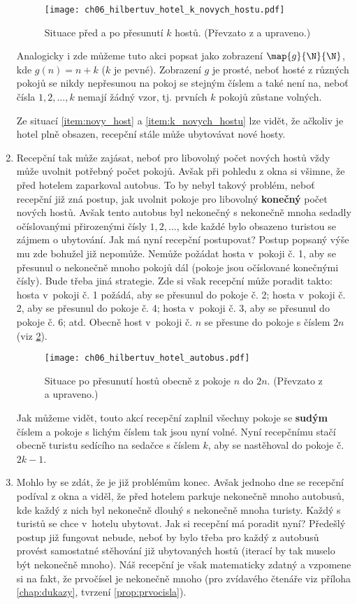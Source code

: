 \begin{enumerate}[label=\textit{(\roman*)}]
    \begin{figure}[h]
        \centering
        \texttt{[image: ch06\_hilbertuv\_hotel\_k\_novych\_hostu.pdf]}
        \caption{Situace před a po přesunutí $k$ hostů. (Převzato z \cite{Rmoutil2022} a upraveno.)}
        \label{fig:hilbertuv_hotel_k_novych_hostu}
    \end{figure}
    Analogicky i zde můžeme tuto akci popsat jako zobrazení $\map{g}{\N}{\N}$, kde $g(n)=n+k$ ($k$ je pevné). Zobrazení $g$ je prosté, neboť hosté z různých pokojů se nikdy nepřesunou na pokoj se stejným číslem a také není na, neboť čísla $1,2,\dots,k$ nemají žádný vzor, tj. prvních $k$ pokojů zůstane volných.\par
    Ze situací \ref{item:novy_host} a \ref{item:k_novych_hostu} lze vidět, že ačkoliv je hotel plně obsazen, recepční stále může ubytovávat nové hosty.
    \item Recepční tak může zajásat, neboť pro libovolný počet nových hostů vždy může uvolnit potřebný počet pokojů. Avšak při pohledu z okna si všimne, že před hotelem zaparkoval autobus. To by nebyl takový problém, neboť recepční již zná postup, jak uvolnit pokoje pro libovolný \textbf{konečný} počet nových hostů. Avšak tento autobus byl nekonečný s nekonečně mnoha sedadly očíslovanými přirozenými čísly $1,2,\dots$, kde každé bylo obsazeno turistou se zájmem o ubytování. Jak má nyní recepční postupovat? Postup popsaný výše mu zde bohužel již nepomůže. Nemůže požádat hosta v~pokoji č. 1, aby se přesunul o nekonečně mnoho pokojů dál (pokoje jsou očíslované konečnými čísly). Bude třeba jiná strategie. Zde si však recepční může poradit takto: hosta v~pokoji č. 1 požádá, aby se přesunul do pokoje č. 2; hosta v~pokoji č. 2, aby se přesunul do pokoje č. 4; hosta v~pokoji č. 3, aby se přesunul do pokoje č. 6; atd. Obecně host v~pokoji č. $n$ se přesune do pokoje s číslem $2n$ (viz \ref{fig:hilbertuv_hotel_autobus}).
    \begin{figure}[h]
        \centering
        \texttt{[image: ch06\_hilbertuv\_hotel\_autobus.pdf]}
        \caption{Situace po přesunutí hostů obecně z pokoje $n$ do $2n$. (Převzato z \cite{Rmoutil2022} a upraveno.)}
        \label{fig:hilbertuv_hotel_autobus}
    \end{figure}
    Jak můžeme vidět, touto akcí recepční zaplnil všechny pokoje se \textbf{sudým} číslem a pokoje s lichým číslem tak jsou nyní volné. Nyní recepčnímu stačí obecně turistu sedícího na sedačce s číslem $k$, aby se nastěhoval do pokoje č. $2k-1$.
    \item Mohlo by se zdát, že je již problémům konec. Avšak jednoho dne se recepční podíval z okna a viděl, že před hotelem parkuje nekonečně mnoho autobusů, kde každý z nich byl nekonečně dlouhý s nekonečně mnoha turisty. Každý s turistů se chce v~hotelu ubytovat. Jak si recepční má poradit nyní? Předešlý postup již fungovat nebude, neboť by bylo třeba pro každý z autobusů provést samostatné stěhování již ubytovaných hostů (iterací by tak muselo být nekonečně mnoho). Náš recepční je však matematicky zdatný a vzpomene si na fakt, že prvočísel je nekonečně mnoho (pro zvídavého čtenáře viz příloha \ref{chap:dukazy}, tvrzení \ref{prop:prvocisla}).

\end{enumerate}
